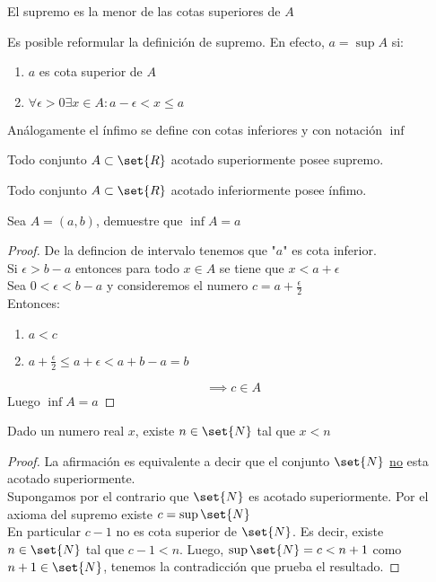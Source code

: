 \documentclass[11pt]{book}
\begin{document}
\begin{obs}
	El supremo es la menor de las cotas superiores de $A$
\end{obs}

\begin{obs}
	Es posible reformular la definición de supremo. En efecto, $a=\sup A$ si:
	\begin{enumerate}
		\item $a$ es cota superior de $A$

		\item $\forall\epsilon>0\exists x\in A:a-\epsilon<x\leq a$

	\end{enumerate}
\end{obs}

\begin{defn}[Ínfimo]
	Análogamente el ínfimo se define con cotas inferiores y con notación $\inf$
\end{defn}
\begin{defn}
	Todo conjunto $A\subset\set{R}$ acotado superiormente posee supremo.
\end{defn}
\begin{obs}
	Todo conjunto $A\subset\set{R}$ acotado inferiormente posee ínfimo.
\end{obs}

\begin{ejm}
	Sea $A=(a,b)$, demuestre que $\inf A=a$
\end{ejm}
\begin{proof}
	De la defincion de intervalo tenemos que "$a$" es cota inferior.\\
	Si $\epsilon>b-a$ entonces para todo $x\in A$ se tiene que $x<a+\epsilon$\\
	Sea $0<\epsilon<b-a$ y consideremos el numero $c=a+\frac{\epsilon}{2}$\\
	Entonces:
	\begin{enumerate}
		\item $a<c$

		\item $a+\frac{\epsilon}{2}\leq a+\epsilon<a+b-a=b$
	\end{enumerate}
	\[\implies c\in A\]
	Luego $\inf A=a$
\end{proof}
\begin{prop}[Arquimediana]
	Dado un numero real $x$, existe $n\in\set{N}$ tal que $x<n$
\end{prop}
\begin{proof}
	La afirmación es equivalente a decir que el conjunto $\set{N}$ \underline{no} esta acotado superiormente.\\
	Supongamos por el contrario que $\set{N}$ es acotado superiormente. Por el axioma del supremo existe $c=\sup\set{N}$\\
	En particular $c-1$ no es cota superior de $\set{N}$. Es decir, existe $n\in\set{N}$ tal que $c-1<n$. Luego, $\sup\set{N}=c<n+1$ como $n+1\in\set{N}$, tenemos la contradicción que prueba el resultado.
\end{proof}
\end{document}
